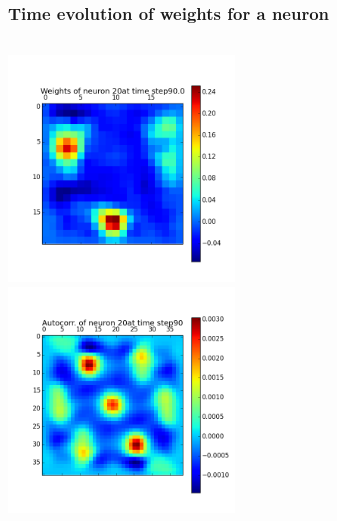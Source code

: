 \begin{frame}
\frametitle{Time evolution of weights for a neuron}
\begin{columns}[t]
\centering
\includegraphics[width=6cm,height=6cm]{neurons/neuron_w_20_t_90.png}\\
\centering
\includegraphics[width=6cm,height=6cm]{neurons/neuron_a_20_t_90.png}\\
\end{columns}
\end{frame}

